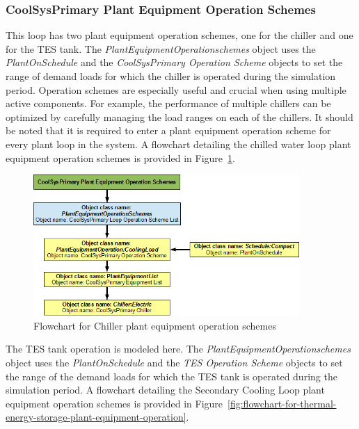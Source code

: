 \subsubsection{CoolSysPrimary Plant Equipment Operation Schemes}\label{coolsysprimary-plant-equipment-operation-schemes}

This loop has two plant equipment operation schemes, one for the chiller and one for the TES tank. The \emph{PlantEquipmentOperationschemes} object uses the \emph{PlantOnSchedule} and the \emph{CoolSysPrimary Operation Scheme} objects to set the range of demand loads for which the chiller is operated during the simulation period. Operation schemes are especially useful and crucial when using multiple active components. For example, the performance of multiple chillers can be optimized by carefully managing the load ranges on each of the chillers. It should be noted that it is required to enter a plant equipment operation scheme for every plant loop in the system. A flowchart detailing the chilled water loop plant equipment operation schemes is provided in Figure~\ref{fig:flowchart-for-chiller-plant-equipment-operation}.

\begin{figure}[htbp] %
\centering
\includegraphics[width=0.9\textwidth, height=0.9\textheight, keepaspectratio=true]{media/image057.png}
\caption{Flowchart for Chiller plant equipment operation schemes \protect \label{fig:flowchart-for-chiller-plant-equipment-operation}}
\end{figure}

The TES tank operation is modeled here. The \emph{PlantEquipmentOperationschemes} object uses the \emph{PlantOnSchedule} and the \emph{TES Operation Scheme} objects to set the range of the demand loads for which the TES tank is operated during the simulation period. A flowchart detailing the Secondary Cooling Loop plant equipment operation schemes is provided in Figure~\ref{fig:flowchart-for-thermal-energy-storage-plant-equipment-operation}.

